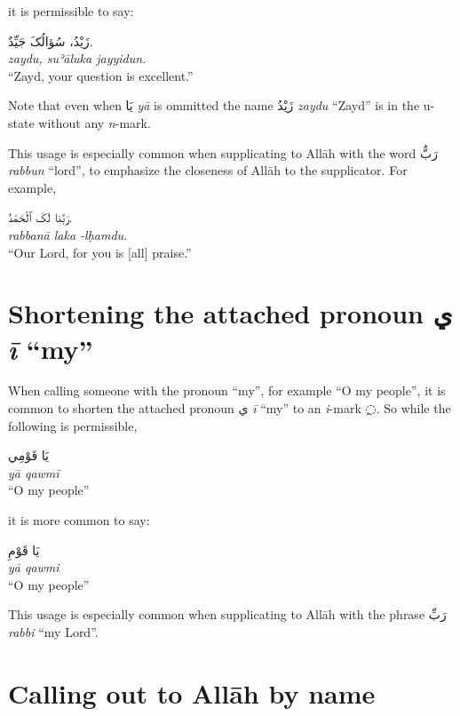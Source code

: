 \documentclass[
  10pt,
]{book}
\begin{document}
it is permissible to say:

\foreignlanguage{arabic}{زَيْدُ، سُؤالُکَ جَيِّدٌ.}\\
\emph{zaydu, suʾāluka jayyidun.}\\
\enquote{Zayd, your question is excellent.}

Note that even when \foreignlanguage{arabic}{يَا} \emph{yā} is ommitted the name \foreignlanguage{arabic}{زَيْدُ} \emph{zaydu} \enquote{Zayd} is in the u-state without any \emph{n}-mark.

This usage is especially common when supplicating to Allāh with the word \foreignlanguage{arabic}{رَبٌّ} \emph{rabbun} \enquote{lord}, to emphasize the closeness of Allāh to the supplicator. For example,

\foreignlanguage{arabic}{رَبَّنا لَکَ ٱلْحَمْدُ.}\\
\emph{rabbanā laka -lḥamdu.}\\
\enquote{Our Lord, for you is {[}all{]} praise.}

\section{\texorpdfstring{Shortening the attached pronoun \foreignlanguage{arabic}{ي} \emph{ī} \enquote{my}}{Shortening the attached pronoun ي ī ``my''}}\label{shortening-the-attached-pronoun-ux64a-i-my}

When calling someone with the pronoun \enquote{my}, for example \enquote{O my people}, it is common to shorten the attached pronoun \foreignlanguage{arabic}{ي} \emph{ī} \enquote{my} to an \emph{i}-mark \foreignlanguage{arabic}{◌ِ}. So while the following is permissible,

\foreignlanguage{arabic}{يَا قَوْمِي}\\
\emph{yā qawmī}\\
\enquote{O my people}

it is more common to say:

\foreignlanguage{arabic}{يَا قَوْمِ}\\
\emph{yā qawmi}\\
\enquote{O my people}

This usage is especially common when supplicating to Allāh with the phrase \foreignlanguage{arabic}{رَبِّ} \emph{rabbi} \enquote{my Lord}.

\section{Calling out to Allāh by name}\label{calling-out-to-allah-by-name}
\end{document}
